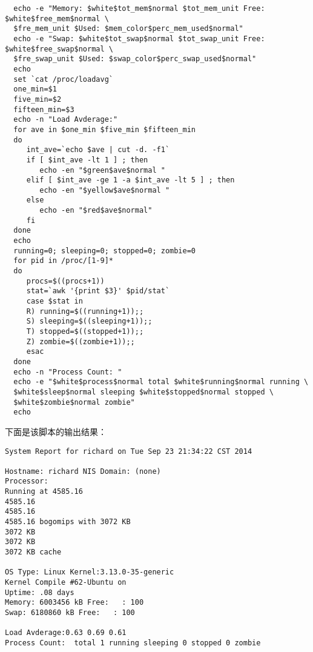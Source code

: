\begin{lstlisting}
  echo -e "Memory: $white$tot_mem$normal $tot_mem_unit Free: $white$free_mem$normal \
  $fre_mem_unit $Used: $mem_color$perc_mem_used$normal"
  echo -e "Swap: $white$tot_swap$normal $tot_swap_unit Free: $white$free_swap$normal \
  $fre_swap_unit $Used: $swap_color$perc_swap_used$normal"
  echo
  set `cat /proc/loadavg`
  one_min=$1
  five_min=$2
  fifteen_min=$3
  echo -n "Load Avderage:"
  for ave in $one_min $five_min $fifteen_min
  do
     int_ave=`echo $ave | cut -d. -f1`
     if [ $int_ave -lt 1 ] ; then
        echo -en "$green$ave$normal "
     elif [ $int_ave -ge 1 -a $int_ave -lt 5 ] ; then
        echo -en "$yellow$ave$normal "
     else
        echo -en "$red$ave$normal"
     fi
  done
  echo
  running=0; sleeping=0; stopped=0; zombie=0
  for pid in /proc/[1-9]*
  do
     procs=$((procs+1))
     stat=`awk '{print $3}' $pid/stat`
     case $stat in
     R) running=$((running+1));;
     S) sleeping=$((sleeping+1));;
     T) stopped=$((stopped+1));;
     Z) zombie=$((zombie+1));;
     esac
  done
  echo -n "Process Count: "
  echo -e "$white$process$normal total $white$running$normal running \
  $white$sleep$normal sleeping $white$stopped$normal stopped \
  $white$zombie$normal zombie"
  echo
\end{lstlisting}

下面是该脚本的输出结果：

\small{
\begin{verbatim}
System Report for richard on Tue Sep 23 21:34:22 CST 2014

Hostname: richard NIS Domain: (none)
Processor: 
Running at 4585.16
4585.16
4585.16
4585.16 bogomips with 3072 KB
3072 KB
3072 KB
3072 KB cache

OS Type: Linux Kernel:3.13.0-35-generic
Kernel Compile #62-Ubuntu on
Uptime: .08 days
Memory: 6003456 kB Free:   : 100
Swap: 6180860 kB Free:   : 100

Load Avderage:0.63 0.69 0.61 
Process Count:  total 1 running sleeping 0 stopped 0 zombie
\end{verbatim}
}
\normalsize
